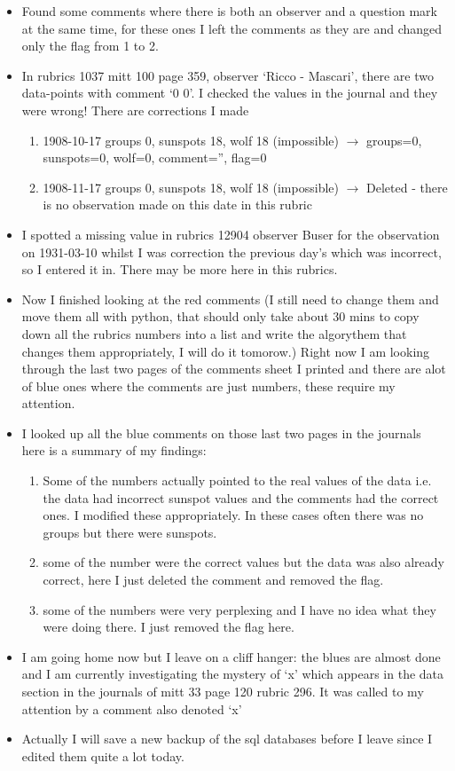 \documentclass[12pt]{article}
\begin{document}
\begin{itemize}
    \item Found some comments where there is both an observer and a question mark at the same time, for these ones I left the comments as they are and changed only the flag from 1 to 2.
    \item In rubrics 1037 mitt 100 page 359, observer `Ricco - Mascari', there are two data-points with comment `0 0'. I checked the values in the journal and they were wrong! There are corrections I made
    \begin{enumerate}
        \item 1908-10-17 groups 0, sunspots 18, wolf 18 (impossible) $\to$ groups=0, sunspots=0, wolf=0, comment='', flag=0
        \item 1908-11-17 groups 0, sunspots 18, wolf 18 (impossible) $\to$ Deleted - there is no observation made on this date in this rubric
    \end{enumerate}
    \item I spotted a missing value in rubrics 12904 observer Buser for the observation on 1931-03-10 whilst I was correction the previous day's which was incorrect, so I entered it in. There may be more here in this rubrics.
    \item Now I finished looking at the red comments (I still need to change them and move them all with python, that should only take about 30 mins to copy down all the rubrics numbers into a list and write the algorythem that changes them appropriately, I will do it tomorow.) Right now I am looking through the last two pages of the comments sheet I printed and there are alot of blue ones where the comments are just numbers, these require my attention.
    \item I looked up all the blue comments on those last two pages in the journals here is a summary of my findings:
    \begin{enumerate}
        \item Some of the numbers actually pointed to the real values of the data i.e. the data had incorrect sunspot values and the comments had the correct ones. I modified these appropriately. In these cases often there was no groups but there were sunspots.
        \item some of the number were the correct values but the data was also already correct, here I just deleted the comment and removed the flag.
        \item some of the numbers were very perplexing and I have no idea what they were doing there. I just removed the flag here.
    \end{enumerate}
    \item I am going home now but I leave on a cliff hanger: the blues are almost done and I am currently investigating the mystery of `x' which appears in the data section in the journals of mitt 33 page 120 rubric 296. It was called to my attention by a comment also denoted `x'
    \item Actually I will save a new backup of the sql databases before I leave since I edited them quite a lot today.
    \end{itemize}
            
\end{document}
